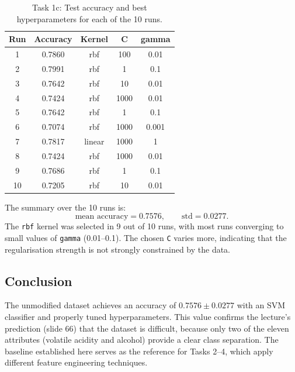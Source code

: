 \begin{table}[h]
\centering
\begin{tabular}{|c|c|c|c|c|}
\hline
\textbf{Run} & \textbf{Accuracy} & \textbf{Kernel} & \textbf{C} & \textbf{gamma} \\
\hline
 1 & 0.7860 & rbf    & 100   & 0.01  \\ \hline
 2 & 0.7991 & rbf    & 1     & 0.1   \\ \hline
 3 & 0.7642 & rbf    & 10    & 0.01  \\ \hline
 4 & 0.7424 & rbf    & 1000  & 0.01  \\ \hline
 5 & 0.7642 & rbf    & 1     & 0.1   \\ \hline
 6 & 0.7074 & rbf    & 1000  & 0.001 \\ \hline
 7 & 0.7817 & linear & 1000  & 1     \\ \hline
 8 & 0.7424 & rbf    & 1000  & 0.01  \\ \hline
 9 & 0.7686 & rbf    & 1     & 0.1   \\ \hline
10 & 0.7205 & rbf    & 10    & 0.01  \\ \hline
\end{tabular}
\caption{Task 1c: Test accuracy and best hyperparameters for each of the
10 runs.}
\label{tab:task1c}
\end{table}

The summary over the 10 runs is:
\[
    \text{mean accuracy} = 0.7576, \qquad
    \text{std} = 0.0277.
\]
The \texttt{rbf} kernel was selected in 9 out of 10 runs, with most
runs converging to small values of \texttt{gamma} (0.01--0.1). The
chosen \texttt{C} varies more, indicating that the regularisation
strength is not strongly constrained by the data.

\subsection{Conclusion}
The unmodified dataset achieves an accuracy of
$0.7576 \pm 0.0277$ with an SVM classifier and properly tuned
hyperparameters. This value confirms the lecture's prediction (slide
66) that the dataset is difficult, because only two of the eleven
attributes (volatile acidity and alcohol) provide a clear class
separation. The baseline established here serves as the reference for
Tasks 2--4, which apply different feature engineering techniques.
